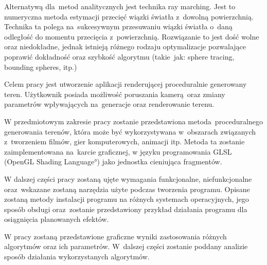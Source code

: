 Alternatywą dla~metod analitycznych jest technika ray marching. Jest to numeryczna metoda estymacji przecięć
wiązki światła z~dowolną powierzchnią.
Technika ta polega na~sukcesywnym przesuwaniu wiązki światła o~daną odległość do momentu przecięcia z~powierzchnią.
Rozwiązanie to jest dość wolne oraz niedokładne, jednak istnieją różnego rodzaju optymalizacje
pozwalające poprawić dokładność oraz szybkość algorytmu (takie~jak: sphere tracing, bounding spheres, itp.)

Celem pracy jest utworzenie aplikacji renderującej proceduralnie generowany teren. Użytkownik posiada możliwość poruszania kamerą oraz zmiany parametrów wpływających na~generacje oraz renderowanie terenu.

W przedmiotowym zakresie pracy zostanie przedstawiona metoda proceduralnego generowania
terenów, która może być wykorzystywana w~obszarach związanych z~tworzeniem filmów, gier komputerowych, animacji itp. Metoda ta zostanie zaimplementowana na~karcie graficznej, w języku programowania GLSL (\ang{OpenGL Shading Language}) jako jednostka cieniująca fragmentów.

W dalszej części pracy zostaną ujęte wymagania funkcjonalne, niefunkcjonalne oraz~wskazane zostaną narzędzia użyte podczas tworzenia programu.
Opisane zostaną metody instalacji programu na różnych systemach operacyjnych, jego sposób obsługi oraz~zostanie przedstawiony przykład działania programu dla osiągnięcia planowanych efektów.

W pracy zostaną przedstawione graficzne wyniki zastosowania różnych algorytmów oraz ich parametrów. W~dalszej części zostanie poddany analizie sposób działania wykorzystanych algorytmów.


